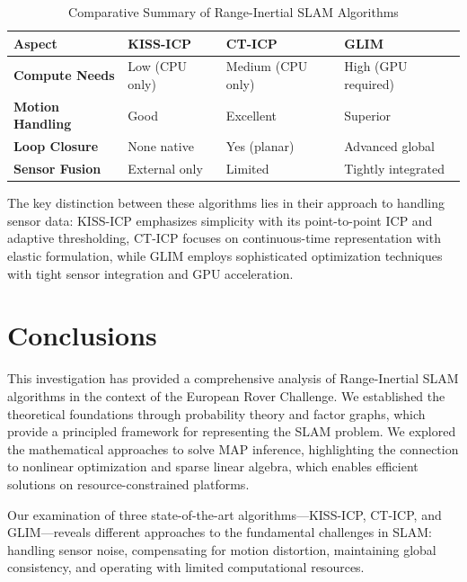 \documentclass[journal]{IEEEtran}
\begin{document}
\begin{table}[!h]
\centering
\caption{Comparative Summary of Range-Inertial SLAM Algorithms}
\label{tab:algorithm-comparison}
\begin{tabular}{|>{\centering\arraybackslash}p{1.5cm}|>{\centering\arraybackslash}p{1.8cm}|>{\centering\arraybackslash}p{1.8cm}|>{\centering\arraybackslash}p{1.8cm}|}
\hline
\textbf{Aspect} & \textbf{KISS-ICP} & \textbf{CT-ICP} & \textbf{GLIM} \\
\hline
\textbf{Compute Needs} & Low (CPU only) & Medium (CPU only) & High (GPU required) \\
\hline
\textbf{Motion Handling} & Good & Excellent & Superior \\
\hline
\textbf{Loop Closure} & None native & Yes (planar) & Advanced global \\
\hline
\textbf{Sensor Fusion} & External only & Limited & Tightly integrated \\
\hline
\end{tabular}
\end{table}

The key distinction between these algorithms lies in their approach to handling sensor data: KISS-ICP emphasizes simplicity with its point-to-point ICP and adaptive thresholding, CT-ICP focuses on continuous-time representation with elastic formulation, while GLIM employs sophisticated optimization techniques with tight sensor integration and GPU acceleration.


\section{Conclusions}

This investigation has provided a comprehensive analysis of Range-Inertial SLAM algorithms in the context of the European Rover Challenge. We established the theoretical foundations through probability theory and factor graphs, which provide a principled framework for representing the SLAM problem. We explored the mathematical approaches to solve MAP inference, highlighting the connection to nonlinear optimization and sparse linear algebra, which enables efficient solutions on resource-constrained platforms.

Our examination of three state-of-the-art algorithms—KISS-ICP, CT-ICP, and GLIM—reveals different approaches to the fundamental challenges in SLAM: handling sensor noise, compensating for motion distortion, maintaining global consistency, and operating with limited computational resources.
\end{document}
